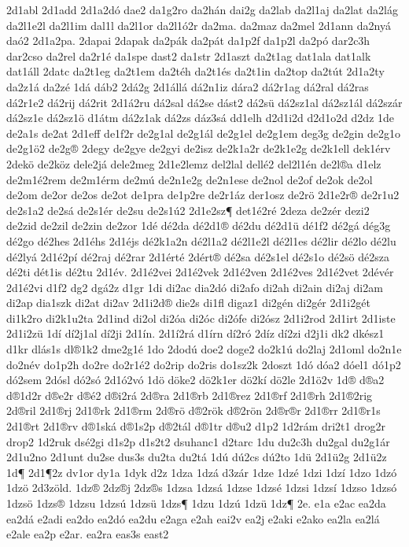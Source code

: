 {2d1abl
2d1add
2d1a2dó
dae2
da1g2ro
da2hán
dai2g
da2lab
da2l1aj
da2lat
da2lág
da2l1e2l
da2l1im
dal1l
da2l1or
da2l1ó2r
da2ma.
da2maz
da2mel
2d1ann
da2nyá
daó2
2d1a2pa.
2dapai
2dapak
da2pák
da2pát
da1p2f
da1p2l
da2pó
dar2c3h
dar2cso
da2rel
da2r1é
da1spe
dast2
da1str
2d1aszt
da2t1ag
dat1ala
dat1alk
dat1áll
2datc
da2t1eg
da2t1em
da2téh
da2t1és
da2t1in
da2top
da2tút
2d1a2ty
da2z1á
da2zé
1dá
dáb2
2dá2g
2d1állá
dá2n1iz
dára2
dá2r1ag
dá2ral
dá2ras
dá2r1e2
dá2rij
dá2rit
2d1á2ru
dá2sal
dá2se
dást2
dá2sü
dá2sz1al
dá2sz1ál
dá2szár
dá2sz1e
dá2sz1ö
d1átm
dá2z1ak
dá2zs
dáz3sá
dd1elh
d2d1i2d
d2d1o2d
d2dz
1de
de2a1s
de2at
2d1eff
de1f2r
de2g1al
de2g1ál
de2g1el
de2g1em
deg3g
de2gin
de2g1o
de2g1ö2
de2g®
2degy
de2gye
de2gyi
de2isz
de2k1a2r
de2k1e2g
de2k1ell
dek1érv
2dekö
de2köz
dele2já
dele2meg
2d1e2lemz
del2lal
dellé2
del2l1én
de2l®a
d1elz
de2m1é2rem
de2m1érm
de2mú
de2n1e2g
de2n1ese
de2nol
de2of
de2ok
de2ol
de2om
de2or
de2os
de2ot
de1pra
de1p2re
de2r1áz
der1osz
de2rö
2d1e2r®
de2r1u2
de2s1a2
de2sá
de2s1ér
de2su
de2s1ú2
2d1e2sz¶
det1é2ré
2deza
de2zér
dezi2
de2zid
de2zil
de2zin
de2zor
1dé
dé2da
dé2d1®
dé2du
dé2d1ü
dé1f2
dé2gá
dég3g
dé2go
dé2hes
2d1éhs
2d1éjs
dé2k1a2n
dé2l1a2
dé2l1e2l
dé2l1es
dé2lir
dé2lo
dé2lu
dé2lyá
2d1é2pí
dé2raj
dé2rar
2d1érté
2dért®
dé2sa
dé2s1el
dé2s1o
dé2sö
dé2sza
dé2ti
dét1is
dé2tu
2d1év.
2d1é2vei
2d1é2vek
2d1é2ven
2d1é2ves
2d1é2vet
2dévér
2d1é2vi
d1f2
dg2
dgá2z
d1gr
1di
di2ac
dia2dó
di2afo
di2ah
di2ain
di2aj
di2am
di2ap
dia1szk
di2at
di2av
2d1i2d®
die2s
di1fl
digaz1
di2gén
di2gér
2d1i2gét
di1k2ro
di2k1u2ta
2d1ind
di2ol
di2óa
di2óc
di2ófe
di2ósz
2d1i2rod
2d1irt
2d1iste
2d1i2zü
1dí
dí2j1al
dí2ji
2d1ín.
2d1í2rá
d1írn
dí2ró
2díz
dí2zi
d2j1i
dk2
dkész1
d1kr
dlás1s
dl®1k2
dme2g1é
1do
2dodú
doe2
doge2
do2k1ú
do2laj
2d1oml
do2n1e
do2név
do1p2h
do2re
do2r1é2
do2rip
do2ris
do1sz2k
2doszt
1dó
dóa2
dóel1
dó1p2
dó2sem
2dósl
dó2só
2d1ó2vó
1dö
döke2
dö2k1er
dö2kí
dö2le
2d1ö2v
1d®
d®a2
d®1d2r
d®e2r
d®é2
d®i2rá
2d®ra
2d1®rb
2d1®rez
2d1®rf
2d1®rh
2d1®2rig
2d®ril
2d1®rj
2d1®rk
2d1®rm
2d®rö
d®2rök
d®2rön
2d®r®r
2d1®rr
2d1®r1s
2d1®rt
2d1®rv
d®1ská
d®1s2p
d®2tál
d®1tr
d®u2
d1p2
1d2rám
dri2t1
drog2r
drop2
1d2ruk
dsé2gi
d1s2p
d1s2t2
dsuhanc1
d2tarc
1du
du2c3h
du2gal
du2g1ár
2d1u2no
2d1unt
du2se
dus3s
du2ta
du2tá
1dú
dú2cs
dú2to
1dü
2d1ü2g
2d1ü2z
1d¶
2d1¶2z
dv1or
dy1a
1dyk
d2z
1dza
1dzá
d3zár
1dze
1dzé
1dzi
1dzí
1dzo
1dzó
1dzö
2d3zöld.
1dz®
2dz®j
2dz®s
1dzsa
1dzsá
1dzse
1dzsé
1dzsi
1dzsí
1dzso
1dzsó
1dzsö
1dzs®
1dzsu
1dzsú
1dzsü
1dzs¶
1dzu
1dzú
1dzü
1dz¶
2e.
e1a
e2ac
ea2da
ea2dá
e2adi
ea2do
ea2dó
ea2du
e2aga
e2ah
eai2v
ea2j
e2aki
e2ako
ea2la
ea2lá
e2ale
ea2p
e2ar.
ea2ra
eas3s
east2
}
